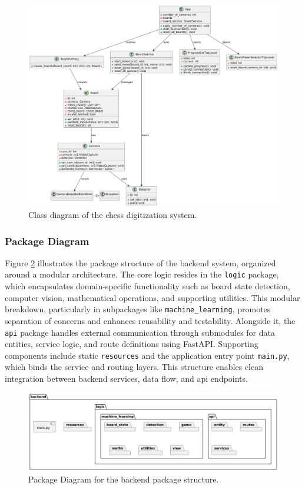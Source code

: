 \begin{figure}[h!]
\centering
\includegraphics[width=0.75\linewidth]{figures/results//uml/class.png}
\caption[Class Diagram]{Class diagram of the chess digitization system.}
\label{fig:class}
\end{figure}

\subsubsection*{Package Diagram}

Figure \ref{fig:package-backend} illustrates the package structure of the backend system, organized around a modular architecture. The core logic resides in the \texttt{logic} package, which encapsulates domain-specific functionality such as board state detection, computer vision, mathematical operations, and supporting utilities. This modular breakdown, particularly in subpackages like \texttt{machine\_learning}, promotes separation of concerns and enhances reusability and testability. Alongside it, the \texttt{api} package handles external communication through submodules for data entities, service logic, and route definitions using FastAPI. Supporting components include static \texttt{resources} and the application entry point \texttt{main.py}, which binds the service and routing layers. This structure enables clean integration between backend services, data flow, and \gls{api} endpoints. \\

\begin{figure}[h!]
    \centering
    \includegraphics[width=\linewidth]{figures/results/uml/package-backend.png}
    \caption[Package Diagram for Backend]{Package Diagram for the backend package structure.}
    \label{fig:package-backend}
\end{figure}

